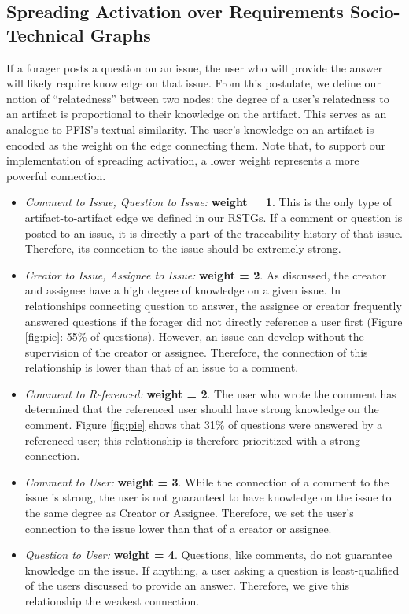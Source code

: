 \documentclass[conference]{IEEEtran}
\begin{document}
\subsection{Spreading Activation over Requirements Socio-Technical Graphs}
If a forager posts a question on an issue, the user who will provide the answer will likely require knowledge on that issue. From this postulate, we define our notion of ``relatedness'' between two nodes: the degree of a user's relatedness to an artifact is proportional to their knowledge on the artifact. This serves as an analogue to PFIS's textual similarity. The user's knowledge on an artifact is encoded as the weight on the edge connecting them. Note that, to support our implementation of spreading activation, a lower weight represents a more powerful connection.
\begin{itemize}
  \item \textit{Comment to Issue, Question to Issue:} \textbf{weight = 1}. This is the only type of artifact-to-artifact edge we defined in our RSTGs. If a comment or question is posted to an issue, it is directly a part of the traceability history of that issue. Therefore, its connection to the issue should be extremely strong.
  \item \textit{Creator to Issue, Assignee to Issue:} \textbf{weight = 2}. As discussed, the creator and assignee have a high degree of knowledge on a given issue. In relationships connecting question to answer, the assignee or creator frequently answered questions if the forager did not directly reference a user first (Figure \ref{fig:pie}: 55\% of questions). However, an issue can develop without the supervision of the creator or assignee. Therefore, the connection of this relationship is lower than that of an issue to a comment.
  \item \textit{Comment to Referenced:}  \textbf{weight = 2}. The user who wrote the comment has determined that the referenced user should have strong knowledge on the comment. Figure \ref{fig:pie} shows that 31\% of questions were answered by a referenced user; this relationship is therefore prioritized with a strong connection.
  \item \textit{Comment to User:} \textbf{weight = 3}. While the connection of a comment to the issue is strong, the user is not guaranteed to have knowledge on the issue to the same degree as Creator or Assignee. Therefore, we set the user's connection to the issue lower than that of a creator or assignee.
  \item \textit{Question to User:} \textbf{weight = 4}. Questions, like comments, do not guarantee knowledge on the issue. If anything, a user asking a question is least-qualified of the users discussed to provide an answer. Therefore, we give this relationship the weakest connection.
\end{itemize}
\end{document}
